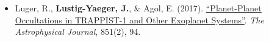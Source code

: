 \documentclass[margin,10pt]{res}
\begin{document}
\begin{resume}
\begin{itemize}
                    \item Luger, R., \textbf{Lustig-Yaeger, J.}, \& Agol, E. (2017).  \href{http://adsabs.harvard.edu/abs/2017ApJ...851...94L}{``Planet-Planet Occultations in TRAPPIST-1 and Other Exoplanet Systems''}. \textit{The Astrophysical Journal}, 851(2), 94.
                \end{itemize}

\end{resume}
\end{document}
